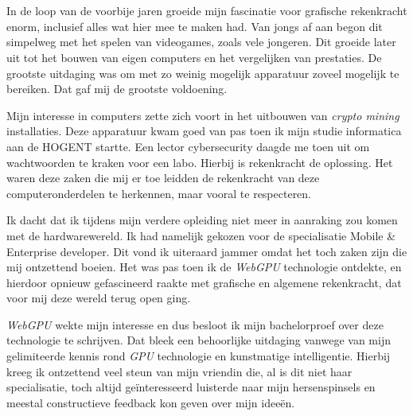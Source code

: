 
\chapter*{}%
\label{ch:voorwoord}


In de loop van de voorbije jaren groeide mijn fascinatie voor grafische rekenkracht enorm, inclusief alles wat hier mee te maken had. Van jongs af aan begon dit simpelweg met het spelen van videogames, zoals vele jongeren. Dit groeide later uit tot het bouwen van eigen computers en het vergelijken van prestaties. De grootste uitdaging was om met zo weinig mogelijk apparatuur zoveel mogelijk te bereiken. Dat gaf mij de grootste voldoening.

\bigbreak{}

Mijn interesse in computers zette zich voort in het uitbouwen van \textit{crypto mining} installaties. Deze apparatuur kwam goed van pas toen ik mijn studie informatica aan de HOGENT startte. Een lector cybersecurity daagde me toen uit om wachtwoorden te kraken voor een labo. Hierbij is rekenkracht de oplossing. Het waren deze zaken die mij er toe leidden de rekenkracht van deze com\-pu\-ter\-on\-der\-de\-len te herkennen, maar vooral te respecteren. 

\bigbreak{}

Ik dacht dat ik tijdens mijn verdere opleiding niet meer in aanraking zou komen met de hardwarewereld. Ik had namelijk gekozen voor de specialisatie Mobile \& Enterprise developer. Dit vond ik uiteraard jammer omdat het toch zaken zijn die mij ontzettend boeien. Het was pas toen ik de \textit{WebGPU} technologie ontdekte, en hierdoor opnieuw gefascineerd raakte met grafische en algemene rekenkracht, dat voor mij deze wereld terug open ging.

\bigbreak{}

\textit{WebGPU} wekte mijn interesse en dus besloot ik mijn bachelorproef over deze technologie te schrijven. Dat bleek een behoorlijke uitdaging vanwege van mijn gelimiteerde kennis rond \textit{GPU} technologie en kunstmatige intelligentie. Hierbij kreeg ik ontzettend veel steun van mijn vriendin die, al is dit niet haar specialisatie, toch altijd geïnteresseerd luisterde naar mijn hersenspinsels en meestal constructieve feedback kon geven over mijn ideeën.

